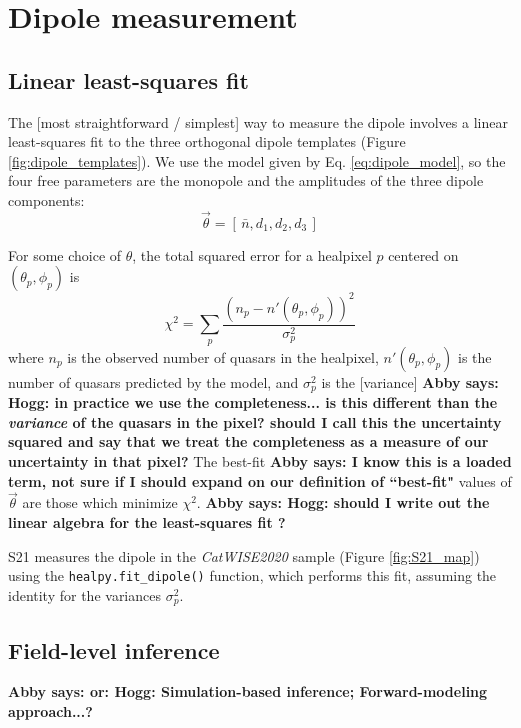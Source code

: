 \documentclass[modern]{aastex631}
\newcommand{\abby}[1]{\textbf{Abby says: #1}}
\newcommand{\catwisetwentytwenty}{\textsl{CatWISE2020}\xspace}
\begin{document}
\section{Dipole measurement}

\subsection{Linear least-squares fit}
\label{sec:standard_dipole}

The [most straightforward / simplest] way to measure the dipole involves a linear least-squares fit to the three orthogonal dipole templates (Figure \ref{fig:dipole_templates}).
We use the model given by Eq. \ref{eq:dipole_model}, so the four free parameters are the monopole and the amplitudes of the three dipole components:
\begin{equation}
    \vec{\theta} = [\,\bar n, d_1, d_2, d_3\,]
\end{equation}

For some choice of $\theta$, the total squared error for a healpixel $p$ centered on $(\theta_p,\phi_p)$ is
\begin{equation}
\label{eq:chisq}
    \chi^2 = \sum_p \frac{\left(n_p - n'(\theta_p,\phi_p)\right)^2}{\sigma_p^2}
\end{equation}
where $n_p$ is the observed number of quasars in the healpixel, $n'(\theta_p,\phi_p)$ is the number of quasars predicted by the model, and $\sigma_p^2$ is the [variance] \abby{Hogg: in practice we use the completeness... is this different than the \textit{variance} of the quasars in the pixel? should I call this the uncertainty squared and say that we treat the completeness as a measure of our uncertainty in that pixel?}
The best-fit \abby{I know this is a loaded term, not sure if I should expand on our definition of ``best-fit"} values of $\vec\theta$ are those which minimize $\chi^2$.
\abby{Hogg: should I write out the linear algebra for the least-squares fit ?}

S21 measures the dipole in the \catwisetwentytwenty sample (Figure \ref{fig:S21_map}) using the \texttt{healpy.fit\_dipole()} function, which performs this fit, assuming the identity for the variances $\sigma_p^2$.

\subsection{Field-level inference}
\label{sec:FLI}
\abby{or: Hogg: Simulation-based inference; Forward-modeling approach...?}
\end{document}
